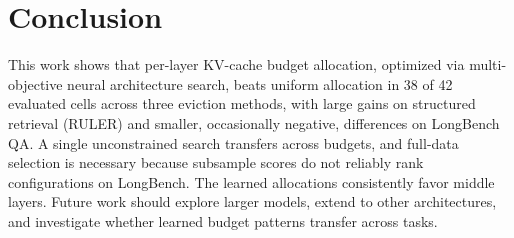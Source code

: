 \documentclass[11pt]{article}
\begin{document}
\section{Conclusion}

This work shows that per-layer KV-cache budget allocation, optimized via multi-objective neural architecture search, beats uniform allocation in 38 of 42 evaluated cells across three eviction methods, with large gains on structured retrieval (RULER) and smaller, occasionally negative, differences on LongBench QA. A single unconstrained search transfers across budgets, and full-data selection is necessary because subsample scores do not reliably rank configurations on LongBench. The learned allocations consistently favor middle layers. Future work should explore larger models, extend to other architectures, and investigate whether learned budget patterns transfer across tasks.

\FloatBarrier




\end{document}
